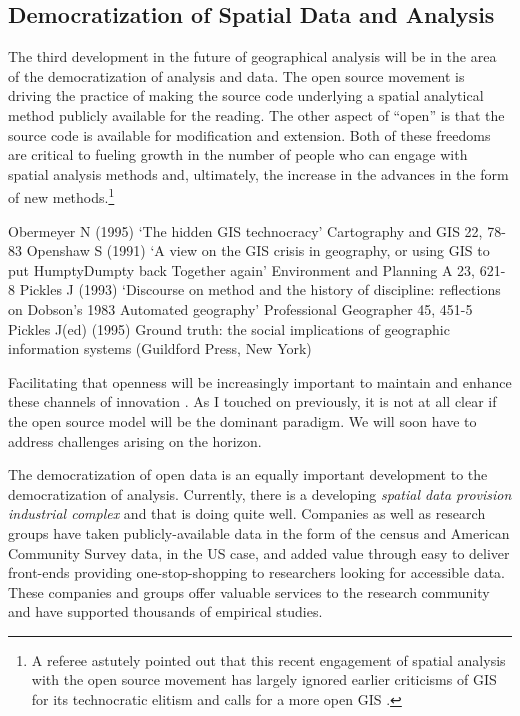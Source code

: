 \documentclass[11pt]{article}
\begin{document}
\subsection{Democratization of Spatial Data and Analysis}
\label{sec:org3bf5ccc}
The third development in the future of geographical analysis will be in the area of
the democratization of analysis and data. The open source movement is driving the practice of making the source code underlying a spatial analytical method publicly
available for the reading. The other aspect of ``open'' is that the source code
is available for modification and extension. Both of these freedoms are critical
to fueling growth in the number of people who can engage with spatial analysis
methods and, ultimately, the increase in the advances in the form of new
methods.\footnote{A referee astutely pointed out that 
this recent engagement of spatial
analysis with the open source movement has largely ignored earlier criticisms of
GIS for its technocratic elitism\cite{obermeyer_1995} and calls for a
more open GIS \cite{pickles_1995}.}

Obermeyer N (1995) ‘The hidden GIS technocracy’ Cartography and GIS 22, 78-83
Openshaw S (1991) ‘A view on the GIS crisis in geography, or using GIS to put HumptyDumpty back Together again’ Environment and Planning A 23, 621-8
Pickles J (1993) ‘Discourse on method and the history of discipline: reflections on
Dobson’s 1983 Automated geography’ Professional Geographer 45, 451-5
Pickles J(ed) (1995) Ground truth: the social implications of geographic information
systems (Guildford Press, New York) 

Facilitating that openness will be increasingly important to maintain and
enhance these channels of innovation \cite{rey_show_2009}. As I touched on
previously, it is not at all clear if the open source model will be the dominant
paradigm. We will soon have to address challenges arising on the horizon.

The democratization of open data is an equally important development to the
democratization of analysis. Currently, there is a developing \emph{spatial
data provision industrial complex} and that is doing quite well. Companies
\cite{ncdb_2018} as well as research groups \cite{ipums_2018,Logan_2014} have
taken publicly-available data in the form of the census and American Community
Survey data, in the US case, and added value through easy to deliver front-ends
providing one-stop-shopping to researchers looking for accessible data. These
companies and groups offer valuable services to the research community and
have supported thousands of empirical studies.
\end{document}
